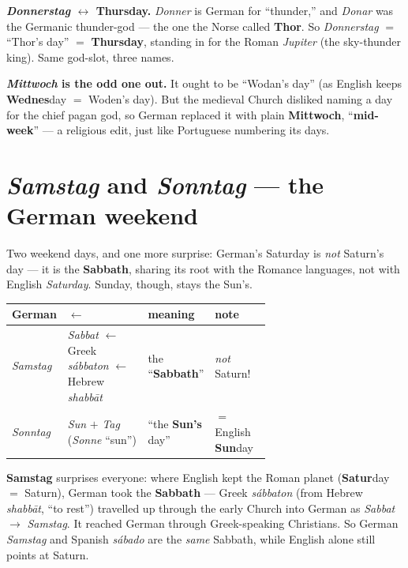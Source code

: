 \begin{cousinweb}
\textbf{\emph{Donnerstag} $\leftrightarrow$ Thursday.} \emph{Donner} is German
for ``thunder,'' and \emph{Donar} was the Germanic thunder-god --- the one the
Norse called \textbf{Thor}. So \emph{Donnerstag} $=$ ``Thor's day'' $=$
\textbf{Thursday}, standing in for the Roman \emph{Jupiter} (the sky-thunder
king). Same god-slot, three names.
\end{cousinweb}

\begin{culture}
\textbf{\emph{Mittwoch} is the odd one out.} It ought to be ``Wodan's day'' (as
English keeps \textbf{Wednes}day $=$ Woden's day). But the medieval Church
disliked naming a day for the chief pagan god, so German replaced it with plain
\textbf{Mittwoch}, ``\textbf{mid-week}'' --- a religious edit, just like
Portuguese numbering its days.
\end{culture}

\section{\emph{Samstag} and \emph{Sonntag} --- the German weekend}
\label{lesson:wochentage-2}

Two weekend days, and one more surprise: German's Saturday is \emph{not}
Saturn's day --- it is the \textbf{Sabbath}, sharing its root with the Romance
languages, not with English \emph{Saturday}. Sunday, though, stays the Sun's.

\noindent
\begin{tabularx}{\linewidth}{@{}>{\raggedright\arraybackslash}p{0.14\linewidth}>{\raggedright\arraybackslash}p{0.31\linewidth}>{\raggedright\arraybackslash}p{0.20\linewidth}>{\raggedright\arraybackslash}X@{}}
\toprule
German & $\leftarrow$ & meaning & note \\
\midrule
\emph{Samstag} & \emph{Sabbat} $\leftarrow$ Greek \emph{s\'{a}bbaton} $\leftarrow$ Hebrew \emph{shabb\={a}t} & the ``\textbf{Sabbath}'' & \emph{not} Saturn! \\
\emph{Sonntag} & \emph{Sun} $+$ \emph{Tag} (\emph{Sonne} ``sun'') & ``the \textbf{Sun's} day'' & $=$ English \textbf{Sun}day \\
\bottomrule
\end{tabularx}

\begin{etymology}
\textbf{Samstag} surprises everyone: where English kept the Roman planet
(\textbf{Satur}day $=$ Saturn), German took the \textbf{Sabbath} --- Greek
\emph{s\'{a}bbaton} (from Hebrew \emph{shabb\={a}t}, ``to rest'') travelled up
through the early Church into German as \emph{Sabbat} $\to$ \emph{Samstag}. It
reached German through Greek-speaking Christians. So German \emph{Samstag} and
Spanish \emph{s\'{a}bado} are the \emph{same} Sabbath, while English alone
still points at Saturn.
\end{etymology}

